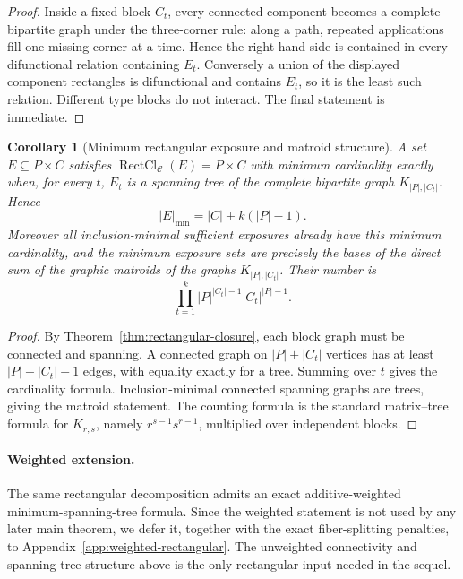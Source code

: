\documentclass[11pt]{article}
\newtheorem{corollary}[definition]{Corollary}
\newcommand{\RectCl}{\operatorname{RectCl}}
\begin{document}
\begin{proof}
Inside a fixed block $C_t$, every connected component becomes a complete
bipartite graph under the three-corner rule: along a path, repeated
applications fill one missing corner at a time.  Hence the right-hand side is
contained in every difunctional relation containing $E_t$.  Conversely a
union of the displayed component rectangles is difunctional and contains
$E_t$, so it is the least such relation.  Different type blocks do not
interact.  The final statement is immediate.
\end{proof}

\begin{corollary}[Minimum rectangular exposure and matroid structure]
\label{cor:rectangular-minimum}
A set $E\subseteq P\times C$ satisfies
$\RectCl_{\mathcal C}(E)=P\times C$ with minimum cardinality exactly when,
for every $t$, $E_t$ is a spanning tree of the complete bipartite graph
$K_{|P|,|C_t|}$.  Hence
\[
 \boxed{
 |E|_{\min}
 =|C|+k(|P|-1).
 }
\]
Moreover all inclusion-minimal sufficient exposures already have this minimum
cardinality, and the minimum exposure sets are precisely the bases of the
direct sum of the graphic matroids of the graphs $K_{|P|,|C_t|}$.
Their number is
\[
 \boxed{
 \prod_{t=1}^k |P|^{|C_t|-1}|C_t|^{|P|-1}.
 }
\]
\end{corollary}

\begin{proof}
By Theorem~\ref{thm:rectangular-closure}, each block graph must be connected
and spanning.  A connected graph on $|P|+|C_t|$ vertices has at least
$|P|+|C_t|-1$ edges, with equality exactly for a tree.  Summing over $t$
gives the cardinality formula.  Inclusion-minimal connected spanning graphs
are trees, giving the matroid statement.  The counting formula is the standard
matrix--tree formula for $K_{r,s}$, namely $r^{s-1}s^{r-1}$, multiplied over
independent blocks.
\end{proof}

\paragraph{Weighted extension.}
The same rectangular decomposition admits an exact additive-weighted
minimum-spanning-tree formula.  Since the weighted statement is not used by
any later main theorem, we defer it, together with the exact fiber-splitting
penalties, to Appendix~\ref{app:weighted-rectangular}.  The unweighted
connectivity and spanning-tree structure above is the only rectangular input
needed in the sequel.
\end{document}
